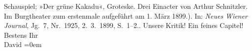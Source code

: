 \begin{ledgroupsized}[t]{13cm}
{{{{                        Schauspiel; »Der grüne Kakadu«, Groteske. Drei Einacter von Arthur
                        Schnitzler. Im Burgtheater zum erstenmale aufgeführt am 1. März 1899.)}.
                     In: \emph{Neues Wiener Journal}, Jg. 7, Nr. 1925,
                        2. 3. 1899, S. 1–2.}}}\label{K_L00897_2h}. Unsere Kritik! Ein feines
               Capitel! \pend
           \pstart
           Bestens Ihr{\\[\baselineskip]}\spacefill\mbox{David}\pend
           \leftskip=0em{}\endnumbering{}\end{ledgroupsized}  \newcommand{\dateiname}{L00897}\newcommand{\titel}{Jakob Julius David an Arthur Schnitzler, 3. 3. 1899}\newcommand{\editorInnen}{Martin Anton Müller und Gerd-Hermann Susen}
            \footnotesize
\begin{ledgroupsized}[t]{11.5cm}
\end{ledgroupsized}
         
      
